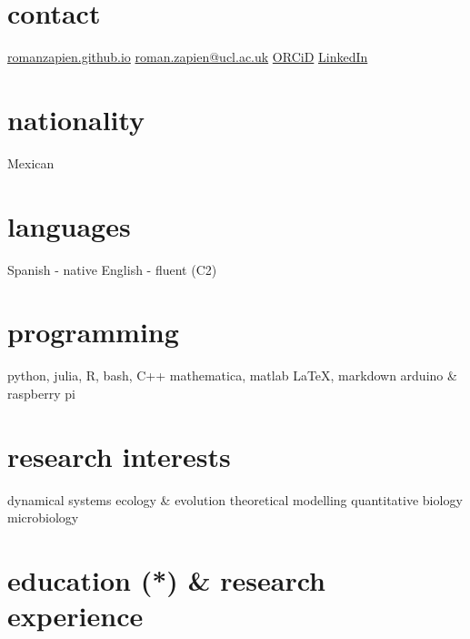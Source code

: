 \documentclass[]{friggeri-cv} %
\begin{document}


\begin{aside} %
\section{contact}
\href{https://romanzapien.github.io}{romanzapien.github.io}
\href{mailto:roman.zapien@ucl.ac.uk}{roman.zapien@ucl.ac.uk}
\href{https://orcid.org/0000-0003-0221-0936}{ORCiD}
\href{https://www.linkedin.com/in/romanzapien-campos/}{LinkedIn}
\section{nationality}
Mexican
\section{languages}
Spanish - native
English - fluent (C2)
\section{programming}
python, julia, R, bash, C++ 
mathematica, matlab
LaTeX, markdown
arduino \& raspberry pi
\section{research interests}
dynamical systems
ecology \& evolution
theoretical modelling
quantitative biology
microbiology
\end{aside}


\section{education (*) \& research experience}
\end{document}
